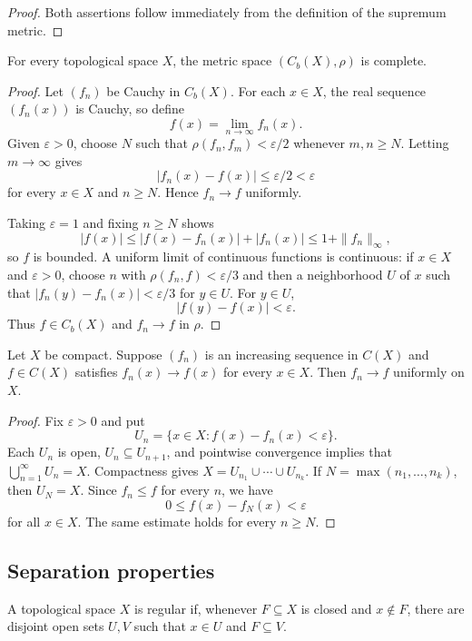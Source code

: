 \begin{proof}
Both assertions follow immediately from the definition of the supremum
metric.
\end{proof}

\begin{thm}
For every topological space $X$, the metric space $(C_b(X),\rho)$ is complete.
\end{thm}

\begin{proof}
Let $(f_n)$ be Cauchy in $C_b(X)$. For each $x\in X$, the real sequence
$(f_n(x))$ is Cauchy, so define
\[
f(x)=\lim_{n\to\infty}f_n(x).
\]
Given $\varepsilon>0$, choose $N$ such that
$\rho(f_n,f_m)<\varepsilon/2$ whenever $m,n\geq N$. Letting
$m\to\infty$ gives
\[
|f_n(x)-f(x)|\leq\varepsilon/2<\varepsilon
\]
for every $x\in X$ and $n\geq N$. Hence $f_n\to f$ uniformly.

Taking $\varepsilon=1$ and fixing $n\geq N$ shows
\[
|f(x)|\leq |f(x)-f_n(x)|+|f_n(x)|\leq 1+\|f_n\|_\infty,
\]
so $f$ is bounded. A uniform limit of continuous functions is continuous:
if $x\in X$ and $\varepsilon>0$, choose $n$ with
$\rho(f_n,f)<\varepsilon/3$ and then a neighborhood $U$ of $x$ such that
$|f_n(y)-f_n(x)|<\varepsilon/3$ for $y\in U$. For $y\in U$,
\[
|f(y)-f(x)|<\varepsilon.
\]
Thus $f\in C_b(X)$ and $f_n\to f$ in $\rho$.
\end{proof}

\begin{thm}
Let $X$ be compact. Suppose $(f_n)$ is an increasing sequence in $C(X)$ and
$f\in C(X)$ satisfies $f_n(x)\to f(x)$ for every $x\in X$. Then $f_n\to f$
uniformly on $X$.
\end{thm}

\begin{proof}
Fix $\varepsilon>0$ and put
\[
U_n=\{x\in X:f(x)-f_n(x)<\varepsilon\}.
\]
Each $U_n$ is open, $U_n\subseteq U_{n+1}$, and pointwise convergence implies
that $\bigcup_{n=1}^{\infty}U_n=X$. Compactness gives
$X=U_{n_1}\cup\cdots\cup U_{n_k}$. If $N=\max(n_1,\ldots,n_k)$, then
$U_N=X$. Since $f_n\leq f$ for every $n$, we have
\[
0\leq f(x)-f_N(x)<\varepsilon
\]
for all $x\in X$. The same estimate holds for every $n\geq N$.
\end{proof}

\subsection{Separation properties}

\begin{de}
A topological space $X$ is regular if, whenever $F\subseteq X$ is closed and
$x\notin F$, there are disjoint open sets $U,V$ such that $x\in U$ and
$F\subseteq V$.
\end{de}

